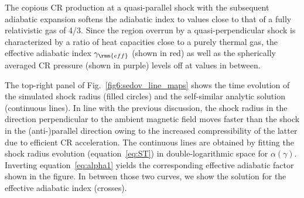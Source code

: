 \documentclass[8pt,a4paper,usenatbib]{mnras}
\begin{document}
The copious CR production at a quasi-parallel shock with the subsequent
adiabatic expansion softens the adiabatic index to values close to that of a
fully relativistic gas of 4/3. Since the region overrun by a quasi-perpendicular
shock is characterized by a ratio of heat capacities close to a purely thermal
gas, the effective adiabatic index $\gamma_{\rmn{eff}}$ (shown in red) as well
as the spherically averaged CR pressure (shown in purple) levels off at values
in between.


The top-right panel of Fig.~\ref{fig6:sedov_line_maps} shows the time evolution
of the simulated shock radius (filled circles) and the self-similar analytic
solution (continuous lines). In line with the previous discussion, the shock
radius in the direction perpendicular to the ambient magnetic field moves faster
than the shock in the (anti-)parallel direction owing to the increased
compressibility of the latter due to efficient CR acceleration. The continuous
lines are obtained by fitting the shock radius evolution (equation~\ref{eq:ST})
in double-logarithmic space for $\alpha(\gamma)$.  Inverting
equation~\ref{eq:alpha1} yields the corresponding effective adiabatic factor
shown in the figure. In between those two curves, we show the solution for the
effective adiabatic index (crosses).
\end{document}
